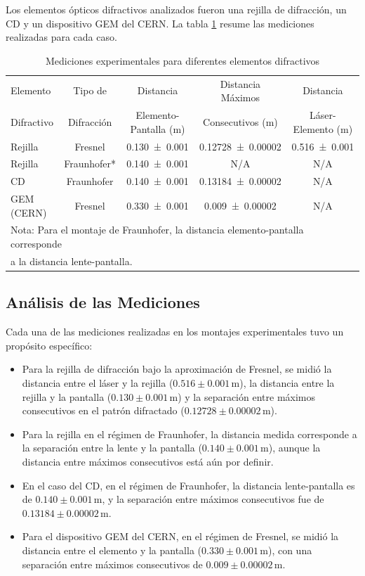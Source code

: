 \documentclass[6pt,a4paper]{article}
\begin{document}
Los elementos ópticos difractivos analizados fueron una rejilla de difracción, un CD y un dispositivo GEM del CERN. La tabla \ref{tab:mediciones} resume las mediciones realizadas para cada caso.  

\begin{table}[H]  
\centering  
\caption{Mediciones experimentales para diferentes elementos difractivos}  
\label{tab:mediciones}  
\begin{tabular}{lcccc}  
\toprule  
Elemento & Tipo de & Distancia & Distancia Máximos & Distancia \\  
Difractivo & Difracción & Elemento-Pantalla (m) & Consecutivos (m) & Láser-Elemento (m) \\  
\midrule  
Rejilla & Fresnel & \num{0.130 \pm 0.001} & \num{0.12728 \pm 0.00002} & \num{0.516 \pm 0.001} \\  
Rejilla & Fraunhofer* & \num{0.140 \pm 0.001} & N/A & N/A \\  
CD & Fraunhofer & \num{0.140 \pm 0.001} & \num{0.13184 \pm 0.00002} & N/A \\  
GEM (CERN) & Fresnel & \num{0.330 \pm 0.001} & \num{0.009 \pm 0.00002} & N/A \\  
\bottomrule  
\multicolumn{5}{l}{\small *Nota: Para el montaje de Fraunhofer, la distancia elemento-pantalla corresponde} \\  
\multicolumn{5}{l}{\small a la distancia lente-pantalla.}  
\end{tabular}  
\end{table}  

\subsection{Análisis de las Mediciones}  

Cada una de las mediciones realizadas en los montajes experimentales tuvo un propósito específico:  

\begin{itemize}  
    \item Para la rejilla de difracción bajo la aproximación de Fresnel, se midió la distancia entre el láser y la rejilla (\(0.516 \pm 0.001 \, \text{m}\)), la distancia entre la rejilla y la pantalla (\(0.130 \pm 0.001 \, \text{m}\)) y la separación entre máximos consecutivos en el patrón difractado (\(0.12728 \pm 0.00002 \, \text{m}\)).  
    \item Para la rejilla en el régimen de Fraunhofer, la distancia medida corresponde a la separación entre la lente y la pantalla (\(0.140 \pm 0.001 \, \text{m}\)), aunque la distancia entre máximos consecutivos está aún por definir.  
    \item En el caso del CD, en el régimen de Fraunhofer, la distancia lente-pantalla es de \(0.140 \pm 0.001 \, \text{m}\), y la separación entre máximos consecutivos fue de \(0.13184 \pm 0.00002 \, \text{m}\).  
    \item Para el dispositivo GEM del CERN, en el régimen de Fresnel, se midió la distancia entre el elemento y la pantalla (\(0.330 \pm 0.001 \, \text{m}\)), con una separación entre máximos consecutivos de \(0.009 \pm 0.00002 \, \text{m}\).  
\end{itemize}  
\end{document}
